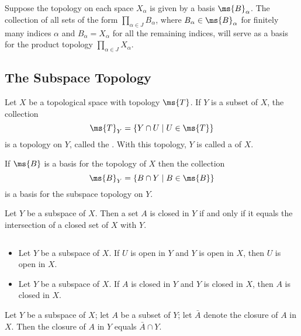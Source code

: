 \begin{theorem}
	Suppose the topology on each space $X_\alpha$ is given by a 
	basis $\ms{B}_\alpha$. The collection of all sets of the form 
	$\prod_{\alpha \in J} B_\alpha$, where $B_\alpha \in 
	\ms{B}_\alpha$ for finitely many indices $\alpha$ and $B_\alpha 
	= X_\alpha$ for all the remaining indices, will serve as a 
	basis for the product topology $\prod_{\alpha \in J} X_\alpha$.
\end{theorem}


\newpage

\subsection{The Subspace Topology}

\begin{definition}
	Let $X$ be a topological space with topology $\ms{T}$. If $Y$ 
	is a subset of $X$, the collection
	\[
		\ms{T}_Y = \{ Y \cap U \mid U \in \ms{T} \}
	\]
	is a topology on $Y$, called the . With this 
	topology, $Y$ 
	is called a  of $X$.
\end{definition}

If $\ms{B}$ is a basis for the topology of $X$ then the collection
\[
	\ms{B}_Y = \{ B \cap Y \mid B \in \ms{B} \}
\]
is a basis for the subspace topology on $Y$.

\begin{theorem}		
	Let $Y$ be a subspace of $X$. Then a set $A$ is 
	closed in $Y$ if and only if it equals the intersection 
	of a closed set of $X$ with $Y$.
\end{theorem}

\begin{theorem}
	$ $
	\begin{itemize}
		\item Let $Y$ be a subspace of $X$. If $U$ is open in $Y$ 
		and $Y$ is open in $X$, then $U$ is open in $X$.
		
		\item Let $Y$ be a subspace of $X$. If $A$ is closed in 
		$Y$ and $Y$ is closed in $X$, then $A$ is closed in $X$.
	\end{itemize}
\end{theorem}

\begin{theorem}
	Let $Y$ be a subspace of $X$; let $A$ be a subset of $Y$; let 
	$\bar{A}$ denote the closure of $A$ in $X$. Then the closure 
	of $A$ in $Y$ equals $\bar{A} \cap Y$.
\end{theorem}

